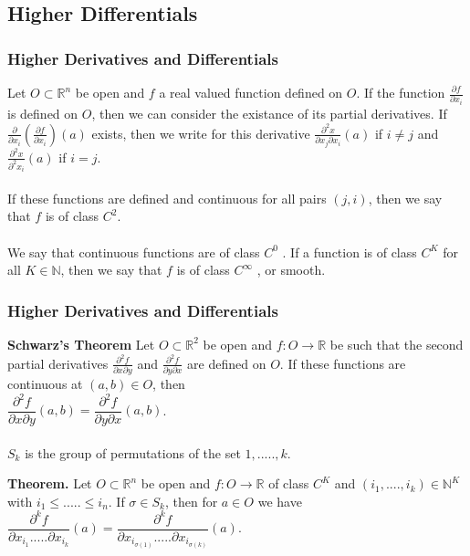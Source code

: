 \documentclass{beamer}
\newcommand{\R}{\mathbb{R}}
\newcommand{\N}{\mathbb{N}}
\begin{document}
\subsection{Higher Differentials}
\begin{frame}
\frametitle{Higher Derivatives and Differentials}

Let $O \subset \R^n$ be open and $f$ a real valued function defined on $O$. If the function $\frac{\partial f}{\partial x_i}$ is defined on $O$, then we can consider the existance of its partial derivatives. If $ \frac{\partial}{\partial x_i}(\frac{\partial f}{\partial x_i})(a)$ exists, then we write for this derivative $\frac{\partial^2 x}{\partial x_j \partial x_i}(a)$ if $i \neq j$ and $\frac{\partial^2 x}{\partial^2 x_i}(a)$ if $i = j$.\\~\\

If these functions are defined and continuous for all pairs $(j,i)$, then we say that $f$ is of class $C^2$.\\~\\

We say that continuous functions are of class $C^0$ . If a function is of class $C^K$ for all
$K \in \N$, then we say that $f$ is of class $C^{\infty}$ , or smooth.

\end{frame}

\begin{frame}

\frametitle{Higher Derivatives and Differentials}
\textbf{Schwarz’s Theorem} Let $O \subset \R^2$ be open and $f: O \to \R$ be such that the second partial derivatives $\frac{\partial^2 f}{\partial x \partial y}$ and $\frac{\partial^2 f}{\partial y \partial x}$ are defined on $O$. If these functions are continuous at $(a,b) \in O$, then \\
\hspace*{3cm} $\dfrac{\partial^2 f}{\partial x \partial y}(a,b)= \dfrac{\partial^2 f}{\partial y \partial x}(a,b)$. \\~\\

$S_k$ is the group of permutations of the set ${1,.....,k}$.

\textbf{Theorem.} Let $O \subset \R^n$ be open and $f:O \to \R$ of class $C^K$ and $(i_1,....,i_k) \in \N^K$ with $i_1 \leq .....\leq i_n$. If  $\sigma \in S_k$, then for $a \in O$ we have\\

\hspace*{3cm} $\dfrac{\partial^k f}{\partial x_{i_1}..... \partial x_{i_k}} (a) = \dfrac{\partial^k f}{\partial x_{i_{\sigma(1)}}..... \partial x_{i_{\sigma(k)}}} (a)$.


\end{frame}
\end{document}
